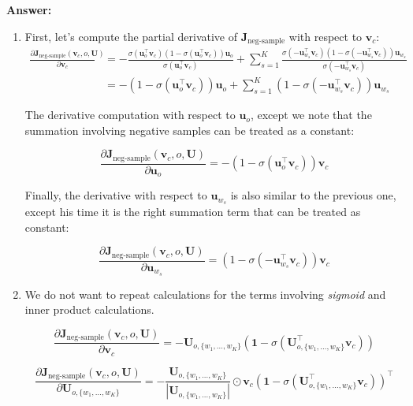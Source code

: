\documentclass{article}
\newenvironment{answer}{
    {\bf Answer:} \sf \begingroup\color{red}
}{\endgroup}%
\begin{document}
\begin{enumerate}[label=(\alph*)]
\begin{shaded}
\begin{answer}
\begin{enumerate}[label=(\roman*)]
\item First, let's compute the partial derivative of $\bm J_{\text{neg-sample}}$ with respect to $\bm v_c$:
\begin{align}
    \frac{\partial \bm J_{\text{neg-sample}}(\bm v_c, o, \bm U)}{\partial \bm v_c} &= -\frac{\sigma(\bm u_o^{\top}\bm v_c)(1-\sigma(\bm u_o^{\top}\bm v_c))\bm u_o}{\sigma(\bm u_o^{\top}\bm v_c)} + \sum_{s=1}^{K}\frac{\sigma(-\bm u_{w_s}^{\top}\bm v_c)(1-\sigma(-\bm u_{w_s}^{\top}\bm v_c))\bm u_{w_s}}{\sigma(-\bm u_{w_s}^{\top}\bm v_c)} \\
    &= -(1-\sigma(\bm u_o^{\top}\bm v_c))\bm u_o + \sum_{s=1}^{K} (1-\sigma(-\bm u_{w_s}^{\top}\bm v_c))\bm u_{w_s}
\end{align}

The derivative computation with respect to $\bm u_o$, except we note that the summation involving negative samples can be treated as a constant:

\begin{equation}
    \frac{\partial \bm J_{\text{neg-sample}}(\bm v_c, o, \bm U)}{\partial \bm u_o} = -(1-\sigma(\bm u_o^{\top}\bm v_c))\bm v_c
\end{equation}

Finally, the derivative with respect to $\bm u_{w_s}$ is also similar to the previous one, except his time it is the right summation term that can be treated as constant:

\begin{equation}\label{wrtuwx}
    \frac{\partial \bm J_{\text{neg-sample}}(\bm v_c, o, \bm U)}{\partial \bm u_{w_s}} = (1-\sigma(-\bm u_{w_s}^{\top}\bm v_c))\bm v_c
\end{equation}

\item \color{red} We do not want to repeat calculations for the terms involving \textit{sigmoid} and inner product calculations. 

\begin{equation}
    \frac{\partial \bm J_{\text{neg-sample}}(\bm v_c, o, \bm U)}{\partial \bm v_c} = -\bm{U}_{o, \{w_1, \dots, w_K\}}\left(\bm 1 - \sigma\left(\bm{U}_{o, \{w_1, \dots, w_K\}}^{\top}\bm v_c\right)\right)
\end{equation}

\begin{equation}
    \frac{\partial \bm J_{\text{neg-sample}}(\bm v_c, o, \bm U)}{\partial \bm{U}_{o, \{w_1, \dots, w_K\}}} = -\frac{\bm{U}_{o, \{w_1, \dots, w_K\}}}{|\bm{U}_{o, \{w_1, \dots, w_K\}}|}\odot\bm v_c \left(\bm 1 - \sigma\left(\bm{U}_{o, \{w_1, \dots, w_K\}}^{\top}\bm v_c\right)\right)^{\top}
\end{equation}


\end{enumerate}
\end{answer}
\end{shaded}
\end{enumerate}
\end{document}
